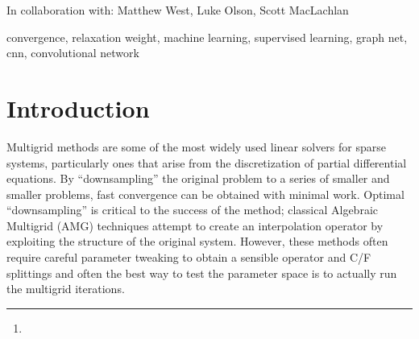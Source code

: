 \documentclass{siamart190516}
\author{\TheName\thanks{\TheAddress}}
\title{{\TheTitle}}
\newcommand{\TheCollaborators}{%
  Matthew West,
  Luke Olson,
  Scott MacLachlan
}
\begin{document}
\maketitle

\begin{center}
In collaboration with:
  {\TheCollaborators}
\end{center}
\vspace{1cm}

\begin{abstract}
  
\end{abstract}

\begin{keywords}
  convergence, relaxation weight, machine learning, supervised learning, graph net, cnn, convolutional network
\end{keywords}

\section{Introduction}\label{sec:intro}

Multigrid methods are some of the most widely used linear solvers for sparse systems, particularly ones that arise from the discretization of partial differential equations.  By ``downsampling'' the original problem to a series of smaller and smaller problems, fast convergence can be obtained with minimal work\cite{mgtut}.  Optimal ``downsampling'' is critical to the success of the method; classical Algebraic Multigrid (AMG) techniques attempt to create an interpolation operator by exploiting the structure of the original system\cite{rs}.  However, these methods often require careful parameter tweaking to obtain a sensible operator and C/F splittings and often the best way to test the parameter space is to actually run the multigrid iterations.

\end{document}
